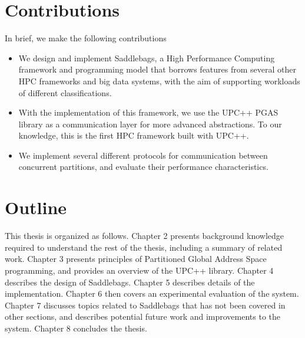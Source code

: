 \documentclass{uit-report}
\begin{document}








\newpage
\section{Contributions}
In brief, we make the following contributions

\begin{itemize}
	\item We design and implement Saddlebags, a High Performance Computing framework and programming model that borrows features from several other HPC frameworks and big data systems, with the aim of supporting workloads of different classifications.
	\item With the implementation of this framework, we use the UPC++ PGAS library as a communication layer for more advanced abstractions. To our knowledge, this is the first HPC framework built with UPC++.
	\item We implement several different protocols for communication between concurrent partitions, and evaluate their performance characteristics.
\end{itemize}









\section{Outline}
This thesis is organized as follows. Chapter 2 presents background knowledge required to understand the rest of the thesis, including a summary of related work. Chapter 3 presents principles of Partitioned Global Address Space programming, and provides an overview of the UPC++ library. Chapter 4 describes the design of Saddlebags. Chapter 5 describes details of the implementation. Chapter 6 then covers an experimental evaluation of the system. Chapter 7 discusses topics related to Saddlebags that has not been covered in other sections, and describes potential future work and improvements to the system. Chapter 8 concludes the thesis.
\end{document}
